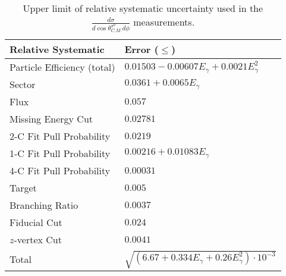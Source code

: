 \begin{table}[h!]
\begin{center}


\caption[Systematics]{\label{tab:systematics}Upper limit of relative systematic uncertainty used in the $\frac{d\sigma}{d\cos\theta^{\pi^0}_{C.M.} d\phi}$ measurements. \vspace{0.75mm}}

\begin{tabular}{p{5.25cm} | p{5.35cm}}
\hline
Relative Systematic & Error ($\leq$)\\
\hline
Particle Efficiency (total) & $0.01503 - 0.00607E_{\gamma} + 0.0021E_{\gamma}^2  $ \\
Sector  & $ 0.0361 + 0.0065E_{\gamma}$ \\
Flux  & $ 0.057$ \\
Missing Energy Cut  & $0.02781$ \\
2-C Fit Pull Probability & $0.0219$ \\
1-C Fit Pull Probability  & $ 0.00216 + 0.01083E_{\gamma}$ \\
4-C Fit Pull Probability  & $0.00031$ \\ 
Target  & $0.005$ \\
Branching Ratio  & $0.0037$ \\
Fiducial Cut & $0.024$ \\
$z$-vertex Cut & $0.0041$ \\
Total & $\sqrt{(6.67 +0.334E_{\gamma} +0.26E_{\gamma}^2)\cdot10^{-3}}$ \\
\hline \hline
\end{tabular}


\end{center}
\end{table}
\vspace{20pt}
